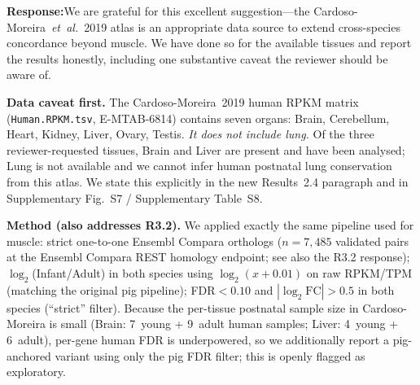 \documentclass[11pt,a4paper]{article}
\newcommand{\response}[1]{%
  \par\vspace{2pt}\noindent\textbf{\textcolor{respcolor}{Response:}}\;\;#1\par\vspace{6pt}}
\begin{document}
\response{We are grateful for this excellent suggestion---the
Cardoso-Moreira~\textit{et~al.}~2019 atlas\cite{cardoso-moreira_gene_2019}
is an appropriate data source to extend cross-species concordance
beyond muscle. We have done so for the available tissues and report the
results honestly, including one substantive caveat the reviewer should
be aware of.

\textbf{Data caveat first.} The Cardoso-Moreira~2019 human RPKM matrix
(\texttt{Human.RPKM.tsv}, E-MTAB-6814) contains seven organs: Brain,
Cerebellum, Heart, Kidney, Liver, Ovary, Testis. \emph{It does not
include lung.} Of the three reviewer-requested tissues, Brain and
Liver are present and have been analysed; Lung is not available and we
cannot infer human postnatal lung conservation from this atlas. We
state this explicitly in the new Results~2.4 paragraph and in
Supplementary Fig.~S7 / Supplementary Table~S8.

\textbf{Method (also addresses R3.2).} We applied exactly the same
pipeline used for muscle: strict one-to-one Ensembl Compara orthologs
($n = 7{,}485$ validated pairs at the Ensembl Compara REST homology
endpoint; see also the R3.2 response); $\log_2$(Infant/Adult) in both
species using $\log_2(x+0.01)$ on raw RPKM/TPM (matching the original
pig pipeline); FDR$<0.10$ and $|\log_2\mathrm{FC}|>0.5$ in both species
(``strict'' filter). Because the per-tissue postnatal sample size in
Cardoso-Moreira is small (Brain: 7~young + 9~adult human samples;
Liver: 4~young + 6~adult), per-gene human FDR is underpowered, so we
additionally report a pig-anchored variant using only the pig FDR
filter; this is openly flagged as exploratory.

}
\end{document}
